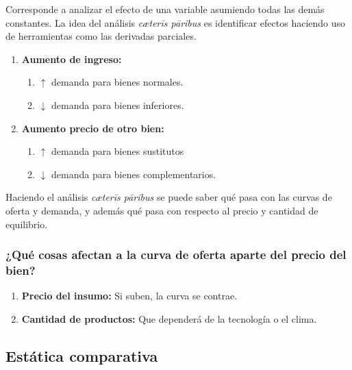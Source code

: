 \documentclass{report}
\begin{document}
Corresponde a analizar el efecto de una variable asumiendo todas las demás constantes. La idea del análisis \textit{cæterīs pāribus} es identificar efectos haciendo uso de herramientas como las derivadas parciales.

\begin{enumerate}
\item \textbf{Aumento de ingreso:}
\begin{enumerate}
\item $\uparrow$ demanda para bienes normales.
\item $\downarrow$ demanda para bienes inferiores.
\end{enumerate}
\item \textbf{Aumento precio de otro bien:}
\begin{enumerate}
\item $\uparrow$ demanda para bienes sustitutos
\item $\downarrow$ demanda para bienes complementarios.
\end{enumerate}
\end{enumerate}

Haciendo el análisis \textit{cæterīs pāribus} se puede saber qué pasa con las curvas de oferta y demanda, y además qué pasa con respecto al precio y cantidad de equilibrio.

\subsubsection{¿Qué cosas afectan a la curva de oferta aparte del precio del bien?}

\begin{enumerate}
\item \textbf{Precio del insumo:} Si suben, la curva se contrae.
\item \textbf{Cantidad de productos:} Que dependerá de la tecnología o el clima.
\end{enumerate}

\subsection{Estática comparativa}
\end{document}
